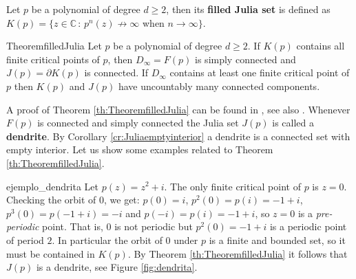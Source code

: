 \begin{mydef}{}{}
Let $p$ be a polynomial of degree $d\geq 2$, then its {\bf filled Julia set} is defined as $K(p) = \{z\in \mathbb{C}\,:\, p^n(z) \not \rightarrow \infty$ when $n\rightarrow \infty\}$. 
\end{mydef}

\begin{mytheo}{}{TheoremfilledJulia}
Let $p$ be a polynomial of degree $d\geq 2$. If $K(p)$ contains all finite critical points of $p$, then $D_\infty=F(p)$ is simply connected and $J(p)=\partial K(p)$ is connected. If $D_\infty$ contains at least one finite critical point of $p$ then $K(p)$ and $J(p)$ have uncountably many connected components.
\end{mytheo}

A proof of Theorem \ref{th:TheoremfilledJulia} can be found in \cite[Corollary 9.5.3]{beardon}, see also \cite[Theorem 9.5]{milnordynamics}. Whenever $F(p)$ is connected and simply connected the Julia set $J(p)$ is called a {\bf dendrite}. By Corollary \ref{cr:Juliaemptyinterior} a dendrite is a connected set with empty interior. Let us show some examples related to Theorem \ref{th:TheoremfilledJulia}.

\begin{myexmp}[breakable]{}{ejemplo_dendrita}
Let $p(z) = z^2+i$. The only finite critical point of $p$ is $z=0$. Checking the orbit of $0$, we get: $p(0)=i$, $p^2(0)=p(i)=-1+i$, $p^3(0)=p(-1+i)=-i$ and $p(-i)=p(i)=-1+i$, so $z=0$ is a \emph{pre-periodic} point. That is, $0$ is not periodic but $p^2(0)=-1+i$ is a periodic point of period $2$. In particular the orbit of $0$ under $p$ is a finite and bounded set, so it must be contained in $K(p)$. By Theorem \ref{th:TheoremfilledJulia} it follows that $J(p)$ is a dendrite, see Figure \ref{fig:dendrita}.
\end{myexmp}

